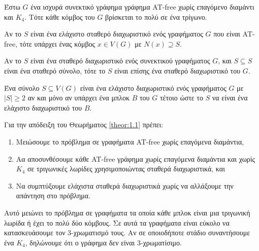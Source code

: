 \begin{lemma}
	\label{lemma:4.1}
	Έστω $G$ ένα ισχυρά συνεκτικό γράφημα γράφημα AT-free χωρίς επαγόμενο διαμάντι και $K_4$. Τότε κάθε κόμβος του $G$ βρίσκεται το πολύ σε ένα τρίγωνο.
\end{lemma}

\begin{lemma}
	\label{lemma:6.1}
	Αν το $S$ είναι ένα ελάχιστο σταθερό διαχωριστικό ενός γραφήματος $G$ που είναι AT-free, τότε υπάρχει ένας κόμβος $x \in V(G)$ με $N(x) \supseteq S$.
\end{lemma}


\begin{lemma}
	\label{lemma:6.2}
	Αν το $S$ είναι ένα σταθερό διαχωριστικό ενός συνεκτικού γραφήματος $G$, και $S \subseteq S$ είναι ένα σταθερό σύνολο, τότε το $S$ είναι επίσης ένα σταθερό διαχωριστικό του $G$.
\end{lemma}


\begin{lemma}
	\label{lemma:6.3}
	Ένα σύνολο $S \subseteq V(G)$ είναι ένα ελάχιστο διαχωριστικό ενός γραφήματος $G$ με $|S| \geq 2$ αν και μόνο αν υπάρχει ένα μπλοκ $B$ του $G$ τέτοιο ώστε το $S$ να είναι ένα ελάχιστο διαχωριστικό του $B$.
\end{lemma}


Για την απόδειξη του Θεωρήματος \ref{theor:1.1} πρέπει:
\begin{enumerate}
	\item Μειώσουμε το πρόβλημα σε γραφήματα AT-free χωρίς επαγόμενα διαμάντια,
	\item Αα αποσυνθέσουμε κάθε AT-free γράφημα χωρίς επαγόμενα διαμάντια και χωρίς $K_4$ σε τριγωνικές λωρίδες χρησιμοποιώντας σταθερά διαχωριστικά, και
	\item Να συμπτύξουμε ελάχιστα σταθερά διαχωριστικά χωρίς να αλλάξουμε την απάντηση στο πρόβλημα.
\end{enumerate}

Αυτό μειώνει το πρόβλημα σε γραφήματα τα οποία κάθε μπλοκ είναι μια τριγωνική λωρίδα ή έχει το πολύ δύο κόμβους. Σε αυτά τα γραφήματα είναι εύκολο να κατασκευάσουμε τον 3-χρωματισμό τους. Αν σε οποιοδήποτε στάδιο συναντήσουμε ένα $K_4$, δηλώνουμε ότι ο γράφημα δεν είναι $3$-χρωματίσιμο.

